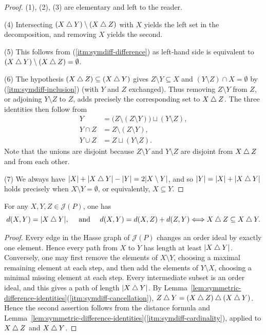 \documentclass[a4paper,leqno]{amsart}
\begin{document}
\begin{proof}
(1), (2), (3) are elementary and left to the reader.

(4)\; Intersecting $(X\mathbin{\triangle} Y)\setminus(X\mathbin{\triangle} Z)$ with $X$ yields the left set in the decomposition, and removing $X$ yields the second.

(5)\; This follows from \textup{(\ref{itm:symdiff-difference})} as left-hand side is equivalent to $(X\mathbin{\triangle} Y)\setminus (X\mathbin{\triangle} Z)=\emptyset$.

(6)\; The hypothesis $(X\mathbin{\triangle} Z)\subseteq(X\mathbin{\triangle} Y)$ gives $Z\setminus Y\subseteq X$ and $(Y\setminus Z)\cap X=\emptyset$ by \textup{(\ref{itm:symdiff-inclusion})} (with $Y$ and $Z$ exchanged). Thus removing $Z\setminus Y$ from $Z$, or adjoining $Y\setminus Z$ to $Z$, adds precisely the corresponding set to $X\mathbin{\triangle} Z$. The three identities then follow from
\[
\begin{aligned}
 Y&=\bigl(Z\setminus(Z\setminus Y)\bigr)\sqcup(Y\setminus Z),\\
 Y\cap Z&=Z\setminus(Z\setminus Y),\\
 Y\cup Z&=Z\sqcup(Y\setminus Z).
\end{aligned}
\]
Note that the unions are disjoint because $Z\setminus Y$ and $Y\setminus Z$ are disjoint from $X\mathbin{\triangle} Z$ and from each other.

(7)\; We always have $|X|+|X\mathbin{\triangle} Y|-|Y|=2|X\setminus Y|$, and so $|Y|=|X|+|X\mathbin{\triangle} Y|$ holds precisely when $X\setminus Y=\emptyset$, or equivalently, $X\subseteq Y$.
\end{proof}

\begin{lem}\label{lem:d(X,Y)}
For any $X,Y,Z\in\mathcal J(P)$, one has
\[
d(X,Y)=|X\mathbin{\triangle} Y|, \quad\text{ and }\quad 
d(X,Y)=d(X,Z)+d(Z,Y)
\Longleftrightarrow
X\mathbin{\triangle} Z\subseteq X\mathbin{\triangle} Y.
\]
\end{lem}

\begin{proof}
Every edge in the Hasse graph of $\mathcal J(P)$ changes an order ideal by exactly one element. Hence every path from $X$ to $Y$ has length at least $|X\mathbin{\triangle} Y|$.  
Conversely, one may first remove the elements of $X\setminus Y$, choosing a maximal remaining element at each step, and then add the elements of $Y\setminus X$, choosing a minimal missing element at each step.  
Every intermediate subset is an order ideal, and this gives a path of length $|X\mathbin{\triangle} Y|$. By Lemma~\ref{lem:symmetric-difference-identities}\textup{(\ref{itm:symdiff-cancellation})}, $Z\mathbin{\triangle} Y=(X\mathbin{\triangle} Z)\mathbin{\triangle}(X\mathbin{\triangle} Y)$. Hence the second assertion follows from the distance formula and Lemma~\ref{lem:symmetric-difference-identities}\textup{(\ref{itm:symdiff-cardinality})}, applied to $X\mathbin{\triangle} Z$ and $X\mathbin{\triangle} Y$.
\end{proof}
\end{document}
